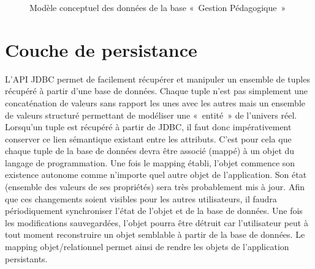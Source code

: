 \documentclass[a4paper,11pt]{article}
\begin{document}
\begin{figure}[bp]
\caption{Modèle conceptuel des données de la base «~Gestion Pédagogique~»\label{mcd_gestion_peda}}
\end{figure}

\section{Couche de persistance}
L'API JDBC permet de facilement récupérer et manipuler un ensemble de tuples récupéré à partir d'une base de données. 
Chaque tuple n'est pas simplement  une concaténation de valeurs sans rapport les unes avec les autres mais un ensemble 
de valeurs structuré permettant de modéliser une «~entité~» de l'univers réel. Lorsqu'un tuple est récupéré à partir de 
JDBC, il faut donc impérativement conserver ce  lien sémantique existant entre les attributs. C'est pour cela que chaque 
tuple de la base  de données devra être associé (mappé) à un objet du langage de programmation.  Une fois le mapping 
établi, l'objet commence son existence autonome comme n'importe quel  autre objet de l'application.  Son état (ensemble 
des valeurs de ses propriétés) sera très probablement mis à jour.  Afin que ces changements soient visibles pour les 
autres utilisateurs, il faudra  périodiquement synchroniser l'état de l'objet et de la base de données. Une fois les  
modifications sauvegardées, l'objet pourra être détruit car l'utilisateur peut à tout moment reconstruire un objet 
semblable à partir de la base de données. Le mapping objet/relationnel  permet ainsi de rendre les objets de 
l'application persistants.
\end{document}
